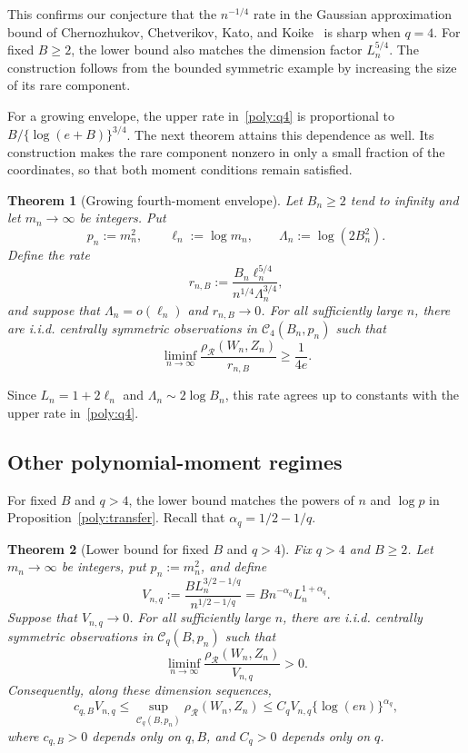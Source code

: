 \documentclass[11pt,letterpaper]{article}
\newtheorem{theorem}{Theorem}
\theoremstyle{remark}
\newcommand{\rh}{\rho_{\mathcal R}}
\begin{document}
This confirms our conjecture that the \(n^{-1/4}\) rate in the Gaussian
approximation bound of Chernozhukov, Chetverikov, Kato, and
Koike~\cite[Theorem~2.5]{CCKK2022} is sharp when \(q=4\).
For fixed \(B\ge2\), the lower bound also matches the dimension factor
\(L_n^{5/4}\). The construction follows from the bounded symmetric
example by increasing the size of its rare component.

For a growing envelope, the upper rate in~\eqref{poly:q4} is
proportional to \(B/\{\log(e+B)\}^{3/4}\).
The next theorem attains this dependence as well. Its construction
makes the rare component nonzero in only a small fraction of the
coordinates, so that both moment conditions remain satisfied.

\begin{theorem}[Growing fourth-moment envelope]\label{opt:q4-growing}
Let \(B_n\ge2\) tend to infinity and let \(m_n\to\infty\) be integers.
Put
\[
 p_n:=m_n^2,\qquad \ell_n:=\log m_n,\qquad
 \Lambda_n:=\log(2B_n^2).
\]
Define the rate
\[
 r_{n,B}:=\frac{B_n\ell_n^{5/4}}{n^{1/4}\Lambda_n^{3/4}},
\]
and suppose that \(\Lambda_n=o(\ell_n)\) and \(r_{n,B}\to0\).
For all sufficiently large \(n\), there are i.i.d. centrally
symmetric observations in \(\mathcal C_4(B_n,p_n)\) such that
\begin{equation}
 \liminf_{n\to\infty}
 \frac{\rh(W_n,Z_n)}{r_{n,B}}\ge\frac1{4e}.
 \label{opt:eq:q4-growing}
\end{equation}
\end{theorem}

Since \(L_n=1+2\ell_n\) and \(\Lambda_n\sim2\log B_n\), this rate
agrees up to constants with the upper rate in~\eqref{poly:q4}.

\subsection{Other polynomial-moment regimes}

For fixed \(B\) and \(q>4\), the lower bound matches the powers of
\(n\) and \(\log p\) in Proposition~\ref{poly:transfer}.
Recall that \(\alpha_q=1/2-1/q\).

\begin{theorem}[Lower bound for fixed \(B\) and \(q>4\)]\label{lower:dense}
Fix \(q>4\) and \(B\ge2\). Let \(m_n\to\infty\) be integers,
put \(p_n:=m_n^2\), and define
\[
 V_{n,q}:=\frac{B L_n^{3/2-1/q}}{n^{1/2-1/q}}
         =Bn^{-\alpha_q}L_n^{1+\alpha_q}.
\]
Suppose that \(V_{n,q}\to0\).
For all sufficiently large \(n\), there are i.i.d. centrally symmetric
observations in \(\mathcal C_q(B,p_n)\) such that
\begin{equation}
 \liminf_{n\to\infty}\frac{\rh(W_n,Z_n)}{V_{n,q}}>0.
 \label{lower:dense-rate}
\end{equation}
Consequently, along these dimension sequences,
\[
 c_{q,B}V_{n,q}
 \le\sup_{\mathcal C_q(B,p_n)}\rh(W_n,Z_n)
 \le C_qV_{n,q}\{\log(en)\}^{\alpha_q},
\]
where \(c_{q,B}>0\) depends only on \(q,B\), and \(C_q>0\)
depends only on \(q\).
\end{theorem}
\end{document}
